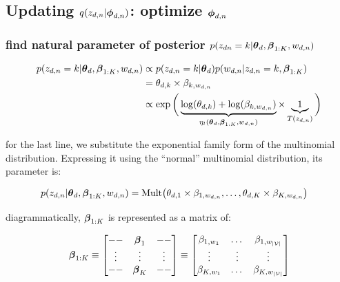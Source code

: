 \documentclass{article}
\begin{document}

\subsection{Updating $q(z_{d,n} | \boldsymbol{\phi}_{d,n})$: optimize $\boldsymbol{\phi}_{d,n}$}

\subsubsection{find natural parameter of posterior $p(z_{dn} = k | \boldsymbol{\theta}_d, \boldsymbol{\beta}_{1:K},w_{d,n} ) $}


\begin{equation}\begin{split}
p(z_{d,n} = k | \boldsymbol{\theta}_d, \boldsymbol{\beta}_{1:K},w_{d,n} ) &\propto  p(z_{d,n} = k | \boldsymbol{\theta}_d) p(w_{d,n} | z_{d,n} = k , \boldsymbol{\beta}_{1:K} ) \\
&= \theta_{d, k} \times  \beta_{k, w_{d,n}} \\
&\propto \exp \bigg( \underbrace{\log(\theta_{d,k}) +\log(\beta_{k,w_{d,n}})}_{\eta_l \left(\boldsymbol{\theta}_d, \boldsymbol{\beta}_{1:K}, w_{d,n} \right)}  \times \underbrace{1}_{T(z_{d,n})}\bigg)\\
\end{split}\end{equation}

for the last line, we substitute the exponential family form of the multinomial distribution. Expressing it using the ``normal'' multinomial distribution, its parameter is:


\begin{equation}\begin{split}
p(z_{d,n} | \boldsymbol{\theta}_d, \boldsymbol{\beta}_{1:K},w_{d,n} )
&=
\text{Mult}\big(
\theta_{d, 1} \times  \beta_{1, w_{d,n}}, \dots, \theta_{d, K} \times  \beta_{K, w_{d,n}} \big)
\end{split}\end{equation}

diagrammatically, $\boldsymbol{\beta}_{1:K}$ is represented as a matrix of:

\begin{equation}\begin{split}
\boldsymbol{\beta}_{1:K} \equiv \begin{bmatrix}
-- & \boldsymbol{\beta}_1 & --\\
\vdots & \vdots & \vdots\\
-- & \boldsymbol{\beta}_K & --\\
\end{bmatrix}
\equiv \begin{bmatrix}
\beta_{1,w_1}& \dots & \beta_{1,w_{|\mathcal{V}|}}\\
\vdots & \vdots & \vdots\\
\beta_{K,w_1}& \dots & \beta_{K,w_{|\mathcal{V}|}}\\
\end{bmatrix}
\end{split}\end{equation}
\end{document}
